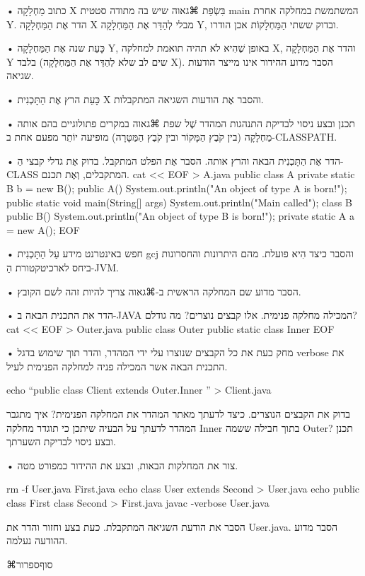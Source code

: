 • כתוב מַחְלָקָה X בִּשְׂפַת ⌘גאוה שיש בה מתודה סטטית main המשתמשת במחלקה אחרת
Y. הדר אֶת הַמַּחְלָקָה X מבלי לְהַדֵּר אֶת הַמַּחְלָקָה Y, ובדוק ששתי
הַמַּחְלָקוֹת אכן הודרו.

• כָּעֵת שנה אֶת הַמַּחְלָקָה Y, באופן שֶׁהִיא לֹא תהיה תואמת למחלקה X, והדר
אֶת הַמַּחְלָקָה Y בלבד (שים לב שלא לְהַדֵּר אֶת הַמַּחְלָקָה X). הסבר מדוע
ההידור אינו מייצר הודעות שגיאה.

• כָּעֵת הרץ אֶת הַתָּכְנִית X והסבר אֶת הודעות השגיאה המתקבלות.

• תכנן ובצע ניסוי לבדיקת התנהגות המהדר שֶׁל שפת ⌘גאוה במקרים פתולוגיים בהם אותה
מַחְלָקָה (בין קֹבֶץ הַמָּקוֹר ובין קֹבֶץ הַמַּטָּרָה) מופיעה יוֹתֵר מפעם אחת
ב-CLASSPATH.


• הדר אֶת הַתָּכְנִית הבאה והרץ אותה. הסבר אֶת הפלט המתקבל. בדוק אֶת גדלי קבצי
הַ-CLASS המתקבלים, וְאֶת תכנם.
cat << EOF > A.java
public class A {
   private static B b = new B();
   public A() { System.out.println("An object of type A is born!"); }
   public static void main(String[] args) {
     System.out.println("Main called\n");
   }
}
class B {
  public B() { System.out.println("An object of type B is born!"); }
  private static A a = new A();
}
EOF
\END

• חפש באינטרנט מידע עַל הַתָּכְנִית gcj והסבר כיצד הִיא פועלת. מהם היתרונות
  והחסרונות ביחס לארכיטקטורת הַ-JVM.

• הסבר מדוע שם המחלקה הראשית ב-⌘גאוה צריך להיות זהה לשם הקובץ.

• הדר את התכנית הבאה ב-JAVA המכילה מחלקה פנימית. אלו קבצים נוצרים? מה גודלם?
cat << EOF > Outer.java
public class Outer {
  public static class Inner {
  }
}
EOF
\END





• מחק כעת את כל הקבצים שנוצרו עלי ידי המהדר, והדר תוך שימוש בדגל verbose את
התכנית הבאה אשר המכילה פניה למחלקה הפנימית לעיל.

echo “public class Client extends Outer.Inner { }” > Client.java
\END


 בדוק את הקבצים הנוצרים. כיצד לדעתך מאתר המהדר את המחלקה הפנימית? איך מתגבר
המהדר לדעתך על הבעיה שיתכן כי תוגדר מחלקה Inner בתוך חבילה ששמה Outer? תכנן
ובצע ניסוי לבדיקת השערתך. 

• צור את המחלקות הבאות, ובצע את ההידור כמפורט מטה.

rm -f User.java First.java 
echo class User extends Second {} > User.java
echo public class First {} class Second{} > First.java
javac -verbose User.java
\END


הסבר את הודעת השגיאה המתקבלת. כעת בצע
 וחזור והדר את User.java. 
הסבר מדוע ההודעה נעלמה.

⌘סוף{ספרור}
